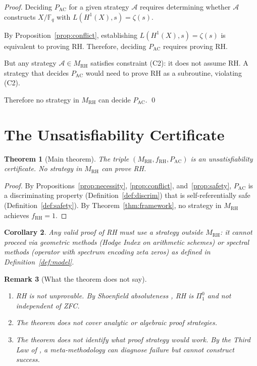 \documentclass[12pt]{article}
\newtheorem{theorem}{Theorem}[section]
\newtheorem{corollary}[theorem]{Corollary}
\newtheorem{remark}[theorem]{Remark}
\newcommand{\FF}{\mathbb{F}}
\newcommand{\MRH}{M_{\mathrm{RH}}}
\newcommand{\PAC}{P_{\mathrm{AC}}}
\begin{document}
\begin{proof}
Deciding $\PAC$ for a given strategy $\mathcal{A}$ requires determining
whether $\mathcal{A}$ constructs $X/\FF_q$ with $L(H^1(X),s) = \zeta(s)$.

By Proposition~\ref{prop:conflict}, establishing $L(H^1(X),s) = \zeta(s)$
is equivalent to proving RH. Therefore, deciding $\PAC$ requires proving
RH.

But any strategy $\mathcal{A} \in \MRH$ satisfies constraint (C2): it
does not assume RH. A strategy that decides $\PAC$ would need to prove
RH as a subroutine, violating (C2).

Therefore no strategy in $\MRH$ can decide $\PAC$. \qed
\end{proof}

\section{The Unsatisfiability Certificate}
\label{sec:cert}

\begin{theorem}[Main theorem]
\label{thm:main}
The triple $(\MRH, f_{\mathrm{RH}}, \PAC)$ is an unsatisfiability
certificate. No strategy in $\MRH$ can prove RH.
\end{theorem}

\begin{proof}
By Propositions~\ref{prop:necessity}, \ref{prop:conflict},
and~\ref{prop:safety}, $\PAC$ is a discriminating property
(Definition~\ref{def:discrim}) that is self-referentially safe
(Definition~\ref{def:safety}). By Theorem~\ref{thm:framework},
no strategy in $\MRH$ achieves $f_{\mathrm{RH}} = 1$.
\end{proof}

\begin{corollary}
Any valid proof of RH must use a strategy outside $\MRH$: it cannot
proceed via geometric methods (Hodge Index on arithmetic schemes) or
spectral methods (operator with spectrum encoding zeta zeros) as
defined in Definition~\ref{def:model}.
\end{corollary}

\begin{remark}[What the theorem does not say]
\begin{enumerate}
\item RH is not unprovable. By Shoenfield absoluteness
  \cite{shoenfield1961}, RH is $\Pi^0_1$ and not independent of ZFC.
\item The theorem does not cover analytic or algebraic proof strategies.
\item The theorem does not identify what proof strategy \emph{would}
  work. By the Third Law of \cite{metamethod2026}, a meta-methodology
  can diagnose failure but cannot construct success.
\end{enumerate}
\end{remark}
\end{document}
